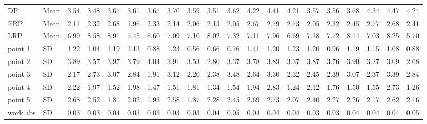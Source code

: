 \begin{longtable}{llrrrrrrrrrrrrrrrrrr}
DP & Mean &       3.54 &       3.48 &       3.67 &       3.61 &       3.67 &       3.70 &       3.59 &       3.51 &       3.62 &       4.22 &       4.41 &       4.21 &       3.57 &       3.56 &       3.68 &       4.34 &       4.47 &       4.24 \\
ERP & Mean &       2.11 &       2.32 &       2.68 &       1.96 &       2.33 &       2.14 &       2.06 &       2.13 &       2.05 &       2.67 &       2.79 &       2.73 &       2.05 &       2.32 &       2.45 &       2.77 &       2.68 &       2.41 \\
LRP & Mean &       6.99 &       8.58 &       8.91 &       7.45 &       6.60 &       7.09 &       7.10 &       8.02 &       7.32 &       7.11 &       7.96 &       6.69 &       7.18 &       7.72 &       8.14 &       7.03 &       8.25 &       5.70 \\
point 1 & SD &       1.22 &       1.04 &       1.19 &       1.13 &       0.88 &       1.23 &       0.56 &       0.66 &       0.76 &       1.41 &       1.20 &       1.23 &       1.20 &       0.96 &       1.19 &       1.15 &       1.08 &       0.88 \\
point 2 & SD &       3.89 &       3.57 &       3.97 &       3.79 &       4.04 &       3.91 &       3.53 &       2.80 &       3.37 &       3.78 &       3.89 &       3.37 &       3.87 &       3.76 &       3.90 &       3.27 &       3.09 &       2.68 \\
point 3 & SD &       2.17 &       2.73 &       3.07 &       2.84 &       1.91 &       3.12 &       2.20 &       2.38 &       3.48 &       2.64 &       3.30 &       2.32 &       2.45 &       2.39 &       3.07 &       2.37 &       3.39 &       2.84 \\
point 4 & SD &       2.22 &       1.97 &       1.52 &       1.98 &       1.47 &       1.51 &       1.81 &       1.34 &       1.54 &       1.94 &       2.83 &       1.24 &       2.12 &       1.76 &       1.50 &       1.55 &       2.73 &       1.26 \\
point 5 & SD &       2.68 &       2.52 &       1.81 &       2.02 &       1.93 &       2.58 &       1.87 &       2.28 &       2.45 &       2.69 &       2.73 &       2.07 &       2.40 &       2.27 &       2.26 &       2.17 &       2.62 &       2.16 \\
work abs & SD &       0.03 &       0.03 &       0.04 &       0.03 &       0.03 &       0.03 &       0.03 &       0.04 &       0.05 &       0.04 &       0.04 &       0.04 &       0.03 &       0.03 &       0.04 &       0.04 &       0.04 &       0.05 \\

\end{longtable}
